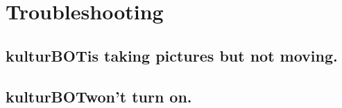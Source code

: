 \documentclass[]{article}
\newcommand{\kb}{kulturBOT}
\newcommand{\kbspace}{\kb \space}
\begin{document}
\section{Troubleshooting}
\subsection{\kbspace is taking pictures but not moving.}
\subsection{\kbspace won't turn on.}
\end{document}
